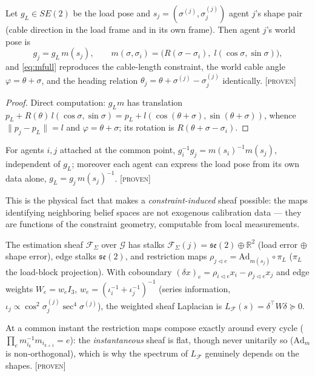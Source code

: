 \documentclass[letterpaper, 10pt, journal]{IEEEtran}
\newcommand{\provtag}{\textsc{[proven]}}
\begin{document}
\begin{lemma}\label{lem:m}
Let $g_L \in SE(2)$ be the load pose and $s_j = (\sigma^{(j)},
\sigma^{(j)}_j)$ agent $j$'s shape pair (cable direction in the load frame and
in its own frame). Then agent $j$'s world pose is
\begin{equation}
g_j = g_L\, m(s_j), \qquad
m(\sigma, \sigma_i) = \bigl(R(\sigma - \sigma_i),\; l(\cos\sigma,
\sin\sigma)\bigr),
\label{eq:mfull}
\end{equation}
and \eqref{eq:mfull} reproduces the cable-length constraint, the world cable
angle $\varphi = \theta + \sigma$, and the heading relation
$\theta_j = \theta + \sigma^{(j)} - \sigma^{(j)}_j$ identically. \provtag
\end{lemma}
\begin{proof}
Direct computation: $g_L m$ has translation $p_L + R(\theta)\, l(\cos\sigma,
\sin\sigma) = p_L + l(\cos(\theta{+}\sigma), \sin(\theta{+}\sigma))$, whence
$\|p_j - p_L\| = l$ and $\varphi = \theta + \sigma$; its rotation is
$R(\theta + \sigma - \sigma_i)$.
\end{proof}

\begin{lemma}\label{lem:edge}
For agents $i, j$ attached at the common point, $g_i^{-1} g_j =
m(s_i)^{-1} m(s_j)$, independent of $g_L$; moreover each agent can express the
load pose from its own data alone, $g_L = g_j\, m(s_j)^{-1}$. \provtag
\end{lemma}
This is the physical fact that makes a \emph{constraint-induced} sheaf
possible: the maps identifying neighboring belief spaces are not exogenous
calibration data --- they are functions of the constraint geometry, computable
from local measurements.

\begin{definition}\label{def:sheafF}
The estimation sheaf $\mathcal{F}_\Sigma$ over $\mathcal{G}$ has stalks
$\mathcal{F}_\Sigma(j) = \mathfrak{se}(2) \oplus \mathbb{R}^2$ (load error
$\oplus$ shape error), edge stalks $\mathfrak{se}(2)$, and restriction maps
$\rho_{j \triangleleft e} = \mathrm{Ad}_{m(s_j)} \circ \pi_L$ ($\pi_L$ the
load-block projection). With coboundary $(\delta x)_e = \rho_{i\triangleleft e}
x_i - \rho_{j\triangleleft e} x_j$ and edge weights $W_e = w_e I_3$,
$w_e = (\iota_i^{-1} + \iota_j^{-1})^{-1}$ (series information,
$\iota_j \propto \cos^2\!\sigma^{(j)}_j \sec^4\!\sigma^{(j)}$), the weighted
sheaf Laplacian is $L_{\mathcal{F}}(s) = \delta^\top W \delta \succeq 0$.
\end{definition}
At a common instant the restriction maps compose exactly around every cycle
($\prod_c m^{-1}_{i_k} m_{i_{k+1}} = e$): the \emph{instantaneous} sheaf is
flat, though never unitarily so ($\mathrm{Ad}_{m}$ is non-orthogonal), which
is why the spectrum of $L_\mathcal{F}$ genuinely depends on the shapes.
\provtag
\end{document}
